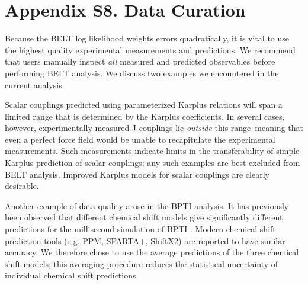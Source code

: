 \documentclass[journal=jacsat,manuscript=article]{achemso}
\begin{document}
\newpage

\section{Appendix S8. Data Curation}

Because the BELT log likelihood weights errors quadratically, it is vital to use the highest quality experimental measurements and predictions.  We recommend that users manually inspect \emph{all} measured and predicted observables before performing BELT analysis.  We discuss two examples we encountered in the current analysis.  

Scalar couplings predicted using parameterized Karplus relations will span a limited range that is determined by the Karplus coefficients.  In several cases, however, experimentally measured J couplings lie \emph{outside} this range--meaning that even a perfect force field would be unable to recapitulate the experimental measurements.  Such measurements indicate limits in the transferability of simple Karplus prediction of scalar couplings; any such examples are best excluded from BELT analysis.  Improved  Karplus models for scalar couplings are clearly desirable.  

Another example of data quality arose in the BPTI analysis.  It has previously been observed that different chemical shift models give significantly different predictions for the millisecond simulation of BPTI \cite{xue2012microsecond}.  Modern chemical shift prediction tools (e.g. PPM, SPARTA+, ShiftX2) are reported to have similar accuracy.  We therefore chose to use the average predictions of the three chemical shift models; this averaging procedure reduces the statistical uncertainty of individual chemical shift predictions.  

\newpage


\end{document}
